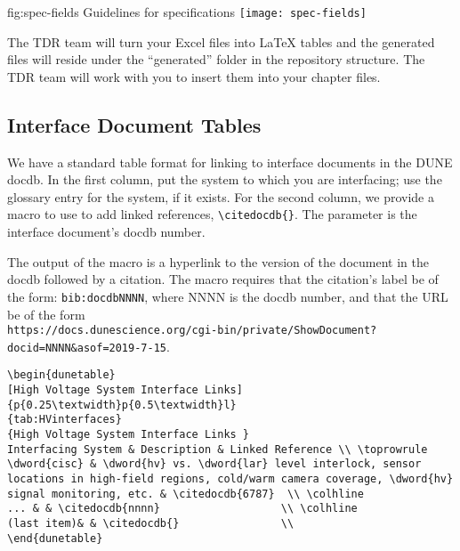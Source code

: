 \begin{dunefigure}{fig:spec-fields}
       {Guidelines for specifications}
    \texttt{[image: spec-fields]}
    \end{dunefigure}
The TDR team will turn your Excel files into LaTeX tables and the generated files will reside under the ``generated'' folder in the repository structure. The TDR team will work with you to insert them into your chapter files.

\FloatBarrier
\subsection{Interface Document Tables}
\label{sec:tables-intfc}

We have a standard table format for linking to interface documents in the DUNE docdb. In the first column, put the system to which you are interfacing; use the glossary entry for the system, if it exists. For the second column, we provide a macro to use to add linked references,  \verb|\citedocdb{}|. The parameter is the interface document's docdb number. 

The output of the macro is a hyperlink to the version of the document in the docdb followed by a citation.  The macro requires that the citation's label be of the form: \verb|bib:docdbNNNN|, where NNNN is the docdb number, and that the URL be of the form \\ \verb|https://docs.dunescience.org/cgi-bin/private/ShowDocument?docid=NNNN&asof=2019-7-15|.



\begin{verbatim}
\begin{dunetable}
[High Voltage System Interface Links]
{p{0.25\textwidth}p{0.5\textwidth}l}
{tab:HVinterfaces}
{High Voltage System Interface Links }   
Interfacing System & Description & Linked Reference \\ \toprowrule
\dword{cisc} & \dword{hv} vs. \dword{lar} level interlock, sensor locations in high-field regions, cold/warm camera coverage, \dword{hv} signal monitoring, etc. & \citedocdb{6787}  \\ \colhline
... & & \citedocdb{nnnn}                   \\ \colhline
(last item)& & \citedocdb{}                \\
\end{dunetable}
\end{verbatim}


